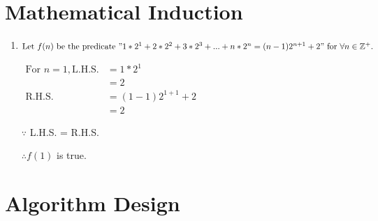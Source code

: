 \documentclass{article}
\begin{document}
\newpage

\section{Mathematical Induction}

\begin{enumerate}[label=(\alph*)]

\item $\text{Let } f(n) \text{ be the predicate } "1*2^1 + 2*2^2 + 3*2^3 + ... + n*2^n = (n-1)2^{n+1} + 2" \text{ for } \forall n \in \mathbb{Z}^+.$

$\begin{aligned}
\text{For } n=1, \text{L.H.S.} &= 1*2^1 \\
&= 2 \\
\text{R.H.S.} &= (1-1)2^{1+1} + 2 \\
&= 2
\end{aligned}$

$\because$ L.H.S. = R.H.S.

$\therefore f(1)$ is true.

\end{enumerate}

\section{Algorithm Design}
\end{document}
